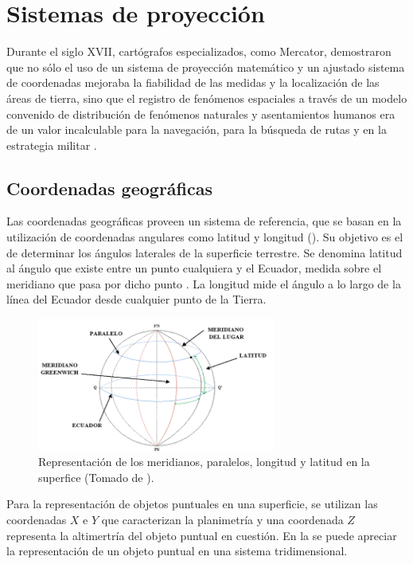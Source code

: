 \section{Sistemas de proyección}
\label{sec:cap2-sistemas-de-proyeccion}
Durante el siglo XVII, cartógrafos especializados, como Mercator, demostraron que no sólo el uso de
un sistema de proyección matemático y un ajustado sistema de coordenadas mejoraba la fiabilidad de
las medidas y la localización de las áreas de tierra, sino que el registro de fenómenos espaciales
a través de un modelo convenido de distribución de fenómenos naturales y asentamientos humanos era
de un valor incalculable para la navegación, para la búsqueda de rutas y en la estrategia militar
\citep{llopis2006sistemas}.

\subsection{Coordenadas geográficas}
Las coordenadas geográficas proveen un sistema de referencia, que se basan en la utilización de
coordenadas angulares como latitud y longitud (). Su objetivo es el de
determinar los ángulos laterales de la superficie terrestre. Se denomina latitud al ángulo que
existe entre un punto cualquiera y el Ecuador, medida sobre el meridiano que pasa por dicho punto
\citep{fAlonsoSig2006}. La longitud mide el ángulo a lo largo de la línea del Ecuador desde
cualquier punto de la Tierra\citep{fAlonsoSig2006}.

\begin{figure}
\centering
\includegraphics[width=0.7\textwidth]{capitulo-2/graphics/ejes-tierra.png}
\caption{\label{fig:sig-plano} Representación de los meridianos, paralelos, longitud y latitud en la superfice (Tomado de \cite{website:emcLonLat2014}).}
\end{figure}


Para la representación de objetos puntuales en una superficie, se utilizan las coordenadas $X$ e
$Y$ que caracterizan la planimetría y una coordenada $Z$ representa la altimertría del objeto
puntual en cuestión. En la  se puede apreciar la representación de un objeto
puntual en una sistema tridimensional.

